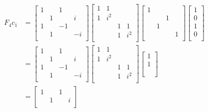 \documentclass[a4paper]{article}
\begin{document}
\begin{align*}
	F_{4}c_{1} & = \begin{bmatrix}
		1 &  & 1 & \\
		 & 1 &  & i \\
		1 &  & -1 & \\
		 & 1 &  & -i \\
	\end{bmatrix} 
	\begin{bmatrix}
		1 & 1 &  & \\
		1 & i^{2} &  & \\
		 &  & 1 & 1\\
		 &  & 1 & i^{2} \\
	\end{bmatrix}
	\begin{bmatrix}
		1 &  &  & \\
		 &  & 1 & \\
		 & 1 &  & \\
		 &  &  & 1 \\
	\end{bmatrix}
	\begin{bmatrix}
		1 \\
		0 \\
		1 \\
		0 \\
	\end{bmatrix} \\
		& = \begin{bmatrix}
		1 &  & 1 & \\
		 & 1 &  & i \\
		1 &  & -1 & \\
		 & 1 &  & -i \\
	\end{bmatrix} 
	\begin{bmatrix}
		1 & 1 &  & \\
		1 & i^{2} &  & \\
		 &  & 1 & 1\\
		 &  & 1 & i^{2} \\
	\end{bmatrix}
	\begin{bmatrix}
		1 \\
		1 \\
		\\
		\\
	\end{bmatrix} \\
		& = \begin{bmatrix}
		1 &  & 1 & \\
		 & 1 &  & i \\

\end{bmatrix}
\end{align*}
\end{document}
